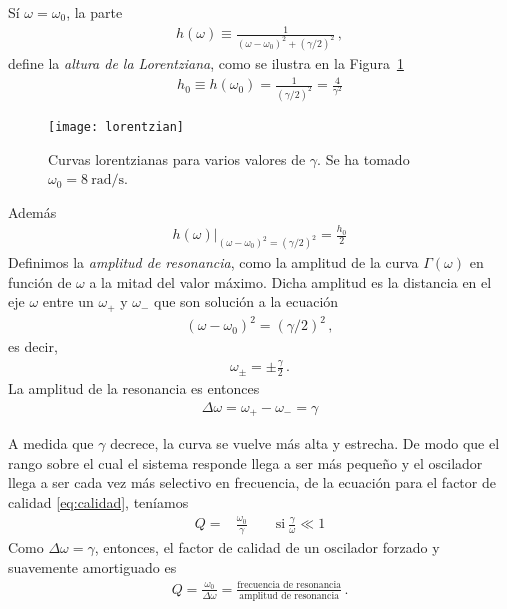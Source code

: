 Sí $\omega=\omega_0$, la parte
\begin{align*}
  h(\omega)\equiv\frac{1}{(\omega-\omega_0)^2+(\gamma/2)^2}\,,
\end{align*}
define la \emph{altura de la Lorentziana}, como se ilustra en la Figura~\ref{fig:lorentzian}
\begin{align*}
 h_0\equiv h(\omega_0)=\frac{1}{(\gamma/2)^2}=\frac{4}{\gamma^2}
\end{align*}
\begin{frame}
\begin{figure}
  \centering
  \texttt{[image: lorentzian]}
  \caption{Curvas lorentzianas para varios valores de $\gamma$. Se ha tomado $\omega_0=\SI{8}{\radian\per\second}$.}
  \label{fig:lorentzian}
\end{figure}
\end{frame}
Además 
\begin{align*}
  \left.h(\omega)\right|_{(\omega-\omega_0)^2=(\gamma/2)^2}=\frac{h_0}{2}
\end{align*}
Definimos la \emph{amplitud de resonancia}, como la amplitud de la curva $\Gamma(\omega)$ en función de $\omega$ a la mitad del valor máximo. Dicha amplitud es la distancia en el eje $\omega$ entre un $\omega_+$ y $\omega_-$ que son solución a la ecuación
\begin{align*}
  (\omega-\omega_0)^2=(\gamma/2)^2\,,
\end{align*}
es decir,
\begin{align*}
  \omega_{\pm}=\pm \frac{\gamma}{2}\,.
\end{align*}
La amplitud de la resonancia es entonces
\begin{align*}
  \Delta\omega=\omega_+-\omega_-=\gamma
\end{align*}

A medida que $\gamma$ decrece, la curva se vuelve más alta y estrecha. De modo que el rango sobre el cual el sistema responde llega a ser más pequeño y el oscilador llega a ser cada vez más selectivo en frecuencia, de la ecuación para el factor de calidad \eqref{eq:calidad}, teníamos
\begin{align*}
Q=&\frac{\omega_0}{\gamma}\qquad\text{si}\ \frac{\gamma}{\omega}\ll 1  
\end{align*}
Como $\Delta\omega=\gamma$, entonces, el factor de calidad de  un oscilador forzado y suavemente amortiguado es
\begin{align*}
  Q=\frac{\omega_0}{\Delta \omega}=\frac{\text{frecuencia de resonancia}}{\text{amplitud de resonancia}}\,.
\end{align*}

